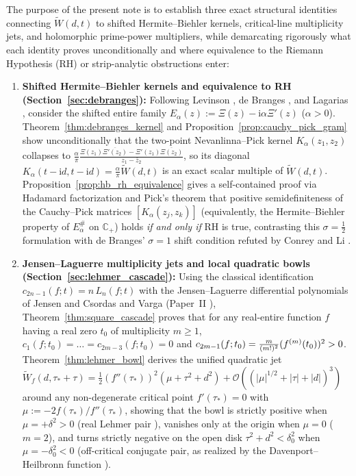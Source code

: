 \documentclass[11pt,reqno]{amsart}
\theoremstyle{definition}
\theoremstyle{remark}
\numberwithin{equation}{section}
\newcommand{\ii}{\mathrm{i}}
\newcommand{\fac}{\mathclose{\mathchar"0021}}
\begin{document}
The purpose of the present note is to establish three exact structural identities connecting $\widetilde{W}(d,t)$ to shifted Hermite--Biehler kernels, critical-line multiplicity jets, and holomorphic prime-power multipliers, while demarcating rigorously what each identity proves unconditionally and where equivalence to the Riemann Hypothesis (RH) or strip-analytic obstructions enter:
\begin{enumerate}[label=\textup{(\arabic*)},leftmargin=2.2em]
  \item \textbf{Shifted Hermite--Biehler kernels and equivalence to RH (Section~\ref{sec:debranges}):} Following Levinson \cite{Levinson1974}, de Branges \cite{deBranges1968,deBranges1986}, and Lagarias \cite{Lagarias2005,Lagarias2006}, consider the shifted entire family $E_\alpha(z) := \Xi(z) - \ii\alpha\Xi'(z)$ ($\alpha > 0$). Theorem~\ref{thm:debranges_kernel} and Proposition~\ref{prop:cauchy_pick_gram} show unconditionally that the two-point Nevanlinna--Pick kernel $K_\alpha(z_1,z_2)$ collapses to $\frac{\alpha}{\pi}\frac{\Xi(z_1)\overline{\Xi'(z_2)} - \Xi'(z_1)\overline{\Xi(z_2)}}{z_1 - \bar{z}_2}$, so its diagonal $K_\alpha(t-\ii d, t-\ii d) = \frac{\alpha}{\pi}\widetilde{W}(d,t)$ is an exact scalar multiple of $\widetilde{W}(d,t)$. Proposition~\ref{prop:hb_rh_equivalence} gives a self-contained proof via Hadamard factorization and Pick's theorem \cite{Pick1916} that positive semidefiniteness of the Cauchy--Pick matrices $[K_\alpha(z_j,z_k)]$ (equivalently, the Hermite--Biehler property of $E_\alpha^\#$ on $\mathbb{C}_+$) holds \emph{if and only if} RH is true, contrasting this $\sigma = \frac{1}{2}$ formulation with de Branges' $\sigma = 1$ shift condition refuted by Conrey and Li \cite{ConreyLi2000}.
  \item \textbf{Jensen--Laguerre multiplicity jets and local quadratic bowls (Section~\ref{sec:lehmer_cascade}):} Using the classical identification $c_{2n-1}(f; t) = n\,L_n(f; t)$ with the Jensen--Laguerre differential polynomials of Jensen \cite{Jensen1913} and Csordas and Varga \cite{CsordasVarga1990} (Paper~II \cite{Missiaen2026Paper2}), Theorem~\ref{thm:square_cascade} proves that for any real-entire function $f$ having a real zero $t_0$ of multiplicity $m \ge 1$, $c_1(f;t_0) = \dots = c_{2m-3}(f;t_0) = 0$ and $c_{2m-1}(f;t_0) = \frac{m}{(m\fac)^2}(f^{(m)}(t_0))^2 > 0$. Theorem~\ref{thm:lehmer_bowl} derives the unified quadratic jet $\widetilde{W}_f(d, \tau_* + \tau) = \frac{1}{2}(f''(\tau_*))^2(\mu + \tau^2 + d^2) + \mathcal{O}((|\mu|^{1/2}+|\tau|+|d|)^3)$ around any non-degenerate critical point $f'(\tau_*) = 0$ with $\mu := -2f(\tau_*)/f''(\tau_*)$, showing that the bowl is strictly positive when $\mu = +\delta^2 > 0$ (real Lehmer pair \cite{Lehmer1956}), vanishes only at the origin when $\mu = 0$ ($m = 2$), and turns strictly negative on the open disk $\tau^2 + d^2 < \delta_0^2$ when $\mu = -\delta_0^2 < 0$ (off-critical conjugate pair, as realized by the Davenport--Heilbronn function \cite{DavenportHeilbronn1936}).

\end{enumerate}
\end{document}
